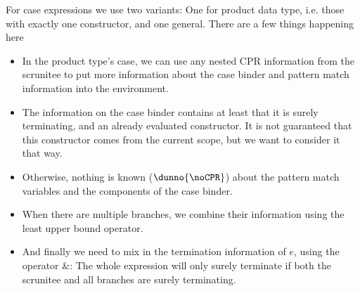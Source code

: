 \documentclass[parskip=half]{scrartcl}
\begin{document}
For case expressions we use two variants: One for product data type, i.e. those with exactly one constructor, and one general. There are a few things happening here
\begin{itemize}
\item In the product type's case, we can use any nested CPR information from the scrunitee to put more information about the case binder and pattern match information into the environment.
\item The information on the case binder contains at least that it is surely terminating, and an already evaluated constructor. It is not guaranteed that this constructor comes from the current scope, but we want to consider it that way.
\item Otherwise, nothing is known ($\dunno{\noCPR}$) about the pattern match variables and the components of the case binder.
\item When there are multiple branches, we combine their information using the least upper bound operator.
\item And finally we need to mix in the termination information of $e$, using the operator $\&$: The whole expression will only surely terminate if both the scrunitee and all branches are surely terminating.
\end{itemize}
\end{document}
